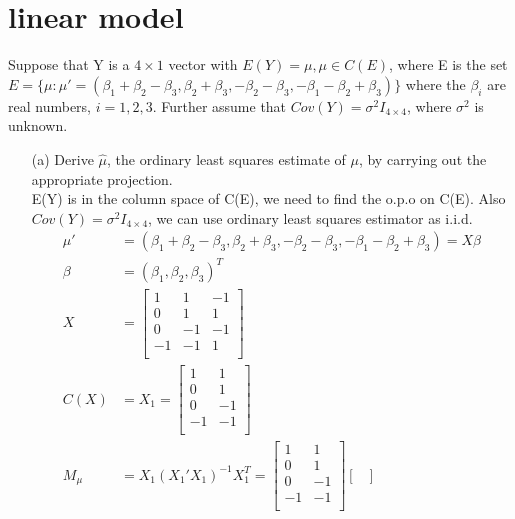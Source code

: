 \section{linear model} 

Suppose that Y is a $4 \times 1$ vector with $E(Y ) = \mu, \mu \in C(E)$, where E is the set $E = \{ \mu: \mu' = (\beta_1 + \beta_2 - \beta_3, \beta_2 + \beta_3, -\beta_2 - \beta_3, -\beta_1-\beta_2 + \beta_3) \} $ where the $\beta_i$ are real numbers, $i = 1, 2, 3$. Further assume that $Cov(Y) = \sigma^2I_{4 \times 4}$, where $\sigma^2$ is unknown.\\
\begin{itemize}
    \item [(a)] Derive $\hat\mu$, the ordinary least squares estimate of $\mu$, by carrying out the
appropriate projection.\\
E(Y) is in the column space of C(E), we need to find the o.p.o on C(E). Also $Cov(Y) = \sigma^2 I_{4 \times 4}$, we can use ordinary least squares estimator as i.i.d.
\begin{align*}
    \mu' &= (\beta_1 + \beta_2 - \beta_3, \beta_2 + \beta_3, -\beta_2 - \beta_3, -\beta_1-\beta_2 + \beta_3) = X \beta\\
    \beta &= (\beta_1, \beta_2, \beta_3)^T\\
    X &= \begin{bmatrix}
           1  & 1 & -1  \\
           0 &  1 & 1\\
           0  & -1 & -1  \\
           -1 &  -1 & 1\\
         \end{bmatrix}\\
    C(X) &= X_1 = \begin{bmatrix}
           1  & 1   \\
           0 &  1 \\
           0  & -1  \\
           -1 &  -1 \\
         \end{bmatrix}\\
    M_{\mu} &= X_1(X_1'X_{1})^{-1} X_{1}^T = \begin{bmatrix}
           1  & 1   \\
           0 &  1 \\
           0  & -1  \\
           -1 &  -1 \\
         \end{bmatrix}\begin{bmatrix}

\end{bmatrix}
\end{align*}
\end{itemize}
